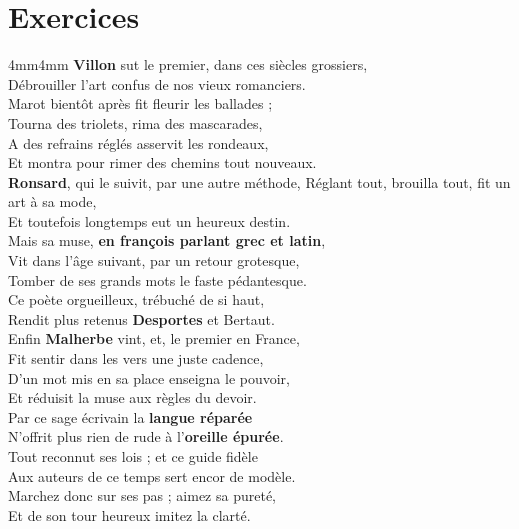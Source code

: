 \section*{Exercices}
{}
\begin{adjustwidth}{4mm}{4mm}\small\setlength{\parindent}{0pt}
\textbf{Villon} sut le premier, dans ces siècles grossiers,\\
Débrouiller l’art confus de nos vieux romanciers.\\
Marot bientôt après fit fleurir les ballades ;\\
Tourna des triolets, rima des mascarades,\\
A des refrains réglés asservit les rondeaux,\\
Et montra pour rimer des chemins tout nouveaux.\\
\textbf{Ronsard}, qui le suivit, par une autre méthode,
Réglant tout, brouilla tout, fit un art à sa mode,\\
Et toutefois longtemps eut un heureux destin.\\
Mais sa muse, \textbf{en françois parlant grec et latin},\\
Vit dans l’âge suivant, par un retour grotesque,\\
Tomber de ses grands mots le faste pédantesque.\\
Ce poète orgueilleux, trébuché de si haut,\\
Rendit plus retenus \textbf{Desportes} et Bertaut.\\
Enfin \textbf{Malherbe} vint, et, le premier en France,\\
Fit sentir dans les vers une juste cadence,\\
D’un mot mis en sa place enseigna le pouvoir,\\
Et réduisit la muse aux règles du devoir.\\
Par ce sage écrivain la \textbf{langue réparée}\\
N’offrit plus rien de rude à l’\textbf{oreille épurée}.\\
Tout reconnut ses lois ; et ce guide fidèle\\
Aux auteurs de ce temps sert encor de modèle.\\
Marchez donc sur ses pas ; aimez sa pureté,\\
Et de son tour heureux imitez la clarté.
\end{adjustwidth}
